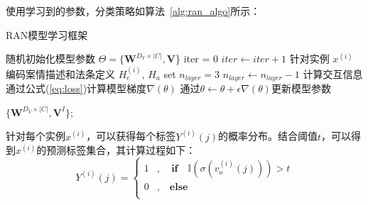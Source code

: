 使用学习到的参数，分类策略如算法~\ref{alg:ran_algo}所示：
\begin{algorithm}[htb]
    \caption{RAN模型学习框架}
    \label{alg:ran_algo}
    \begin{algorithmic}[1]
    \State 随机初始化模型参数 $\Theta=\{\textbf{W}^{D_V\times |C|},\textbf{V}$\}
    \label{code:fram:initialize parameters}
    \State iter = 0
    \label{code:fram:begin}
    \Repeat
    \label{code:fram:repeat}
        \State $iter \leftarrow iter+1$
        \label{code:fram:re_value}
        \label{code:fram:for1}
            \State 针对实例 $x^{(i)}$
            \label{code:fram:task_join1}
            \State 编码案情描述和法条定义 $H_e^{(i)}$, $H_a$
            \label{code:fram:encode}
            \State set $n_{layer} = 3$
            \label{code:fram:recurrent_layer}
            \Repeat
            \label{code:fram:repeat_recurrent}
                \State $n_{layer} \leftarrow n_{layer} - 1$ 
                \label{code:fram:iter_layer}
                \State 计算交互信息
                \label{code:fram:compute_iteraction}
            \State  通过公式(\ref{eq:loss})计算模型梯度$\nabla(\theta)$
            \label{code:fram:com_grad}
            \State 通过$\theta \leftarrow \theta + \epsilon \nabla(\theta)$更新模型参数
            \label{code:fram:update_grad}
        \EndFor
        
    \State
    \Return $\{\textbf{W}^{D_V\times |C|},\textbf{V}^I\}$;
    \end{algorithmic}
\end{algorithm}

针对每个实例$x^{(i)}$，可以获得每个标签$Y^{(i)}(j)$的概率分布。结合阈值$t$，可以得到$x^{(i)}$的预测标签集合，其计算过程如下：
\begin{displaymath}
    Y^{(i)}(j)=\left\{
    \begin{aligned}
    1 &, \quad \textbf{if} \quad \mathbb{I}(\sigma(v_{o}^{(i)}(j))) > t \\
    0 &, \quad \textbf{else} \\
    \end{aligned}
    \right.
\end{displaymath}

